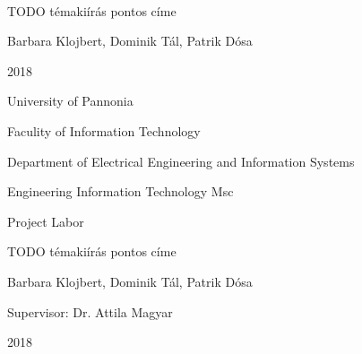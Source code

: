 \begin{titlepage}
	\setlength{\hoffset}{0mm}
	\pagestyle{empty}
	\begin{center} 
		~\\
		\vspace{125pt}	
		\Large 
		TODO témakiírás pontos címe
		\vspace{200pt}
		
		\Large 
		Barbara Klojbert, Dominik Tál, Patrik Dósa
		\vspace{60pt}
		
		\Large 
		2018
	\end{center}
	
	\newpage
	
	\pagestyle{empty}
	
	\newpage
	\pagestyle{empty}
	\begin{center}
		\Large
		University of Pannonia
		
		\vspace{10mm}
		Faculity of Information Technology
		
		\vspace{10mm}
		Department of Electrical Engineering and Information Systems
		
		\vspace{10mm}
		Engineering Information Technology Msc
		
		\vspace{40mm}
		\huge
		Project Labor
		
		\vspace{10mm}
		\LARGE
		TODO témakiírás pontos címe
		
		\vspace{10mm}
		\Large
		Barbara Klojbert, Dominik Tál, Patrik Dósa
		
		\vspace{15mm}
		Supervisor: Dr. Attila Magyar
		
		\vspace{20mm}
		2018
		\normalsize
	\end{center}
\end{titlepage}

\setlength{\hoffset}{4mm}
\newpage